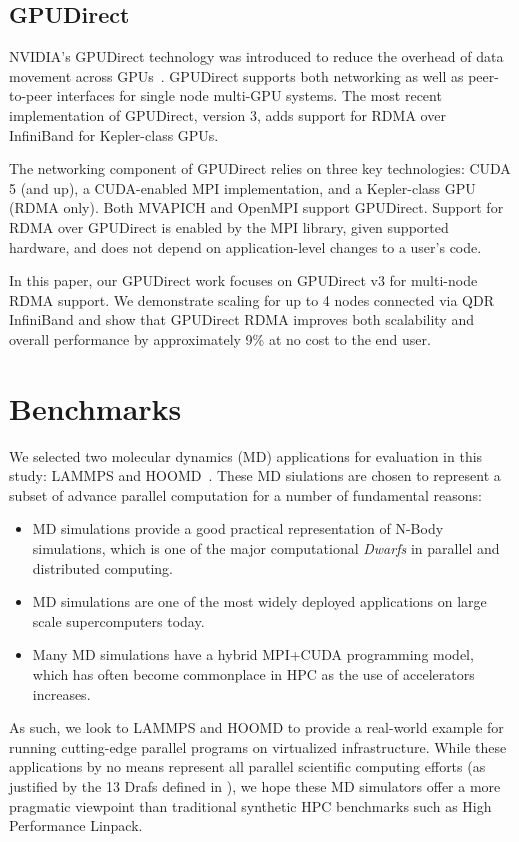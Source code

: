 \subsection{GPUDirect}
NVIDIA's GPUDirect technology was introduced to reduce the overhead of data
movement across GPUs~\cite{GPUDirect, shainer2011development}.  GPUDirect supports both networking as
well as peer-to-peer interfaces for single node multi-GPU systems.  The most
recent implementation of GPUDirect, version 3, adds support for RDMA over
InfiniBand for Kepler-class GPUs. 

The networking component of GPUDirect relies on three key technologies: CUDA 5
(and up), a CUDA-enabled MPI implementation, and a Kepler-class GPU (RDMA only).
Both MVAPICH and OpenMPI support GPUDirect.  Support for RDMA over GPUDirect is
enabled by the MPI library, given supported hardware, and does not depend on
application-level changes to a user's code.  

In this paper, our GPUDirect work focuses on GPUDirect v3 for multi-node RDMA
support.  We demonstrate scaling for up to 4 nodes connected via QDR InfiniBand
and show that GPUDirect RDMA improves both scalability and overall performance
by approximately 9\% at no cost to the end user.


\section{Benchmarks}
We selected two molecular dynamics (MD) applications for evaluation in this study:
LAMMPS and HOOMD~\cite{plimpton2007lammps,anderson2010hoomd}.  These MD siulations are chosen to represent a subset of advance parallel computation for a number of fundamental reasons:

\begin{itemize}
\item MD simulations provide a good practical representation of N-Body simulations, which is one of the major computational \emph{Dwarfs} \cite{asanovic2006landscape} in parallel and distributed computing. 
\item MD simulations are one of the most widely deployed applications on large scale supercomputers today.
\item Many MD simulations have a hybrid MPI+CUDA programming model, which has often become commonplace in HPC as the use of accelerators increases.
\end{itemize}

As such, we look to LAMMPS and HOOMD to provide a real-world example for running cutting-edge parallel programs on virtualized infrastructure. While these applications by no means represent all parallel scientific computing efforts (as justified by the 13 Drafs defined in \cite{asanovic2006landscape}), we hope these MD simulators offer a more pragmatic viewpoint than traditional synthetic HPC benchmarks such as High Performance Linpack. 

